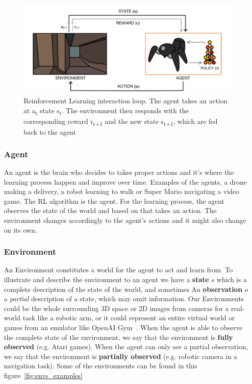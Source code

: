 \begin{figure}[!htb]
	\centering
		\includegraphics[width=.5\linewidth]{figures/Agent-Env.png}
		\caption{Reinforcement Learning interaction loop. The agent takes an action at a\textsubscript{t} state s\textsubscript{t}. The environment then responds with the corresponding reward r\textsubscript{t+1} and the new state s\textsubscript{t+1}, which are fed back to the agent~\parencite{arulkumaran2017brief}}
		\label{fig:agent_env}
\end{figure}

\subsubsection{Agent}\label{Agent}
An agent is the brain who decides to takes proper actions and it's where the learning process happen and improve over time. Examples of the agents, a drone making a delivery, a robot learning to walk or Super Mario navigating a video game. The RL algorithm is the agent. For the learning process, the agent observes the state of the world and based on that takes an action. The environment changes accordingly to the agent's actions and it might also change on its own. 


\subsubsection{Environment}\label{Environment}
An Environment constitutes a world for the agent to act and learn from. 
To illustrate and describe the environment to an agent we have a \textbf{state} \(s\) which is a complete description of the state of the world, and sometimes An \textbf{observation} \(o\) a \textit{partial} description of a state, which may omit information.
Our Environments could be the whole surrounding 3D space or 2D images from cameras for a real-world task like a robotic arm, or it could represent an entire virtual world or games from an emulator like OpenAI Gym~\parencite{brockman2016openai}.
When the agent is able to observe the complete state of the environment, we say that the environment is \textbf{fully observed} (e.g. Atari games). When the agent can only see a partial observation, we say that the environment is \textbf{partially observed} (e.g. robotic camera in a navigation task).
Some of the environments can be found in this figure~\ref{fig:envs_examples}

